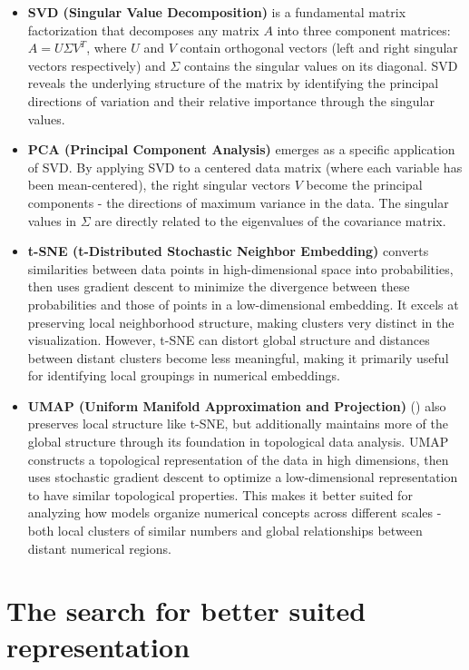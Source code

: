 \documentclass[
  a4paper, twoside, 10pt, titlepage]{book}
\begin{document}
\begin{itemize}
\item
  \textbf{SVD (Singular Value Decomposition)} is a fundamental matrix
  factorization that decomposes any matrix \(A\) into three component
  matrices: \(A = U\Sigma V^T\), where \(U\) and \(V\) contain
  orthogonal vectors (left and right singular vectors respectively) and
  \(\Sigma\) contains the singular values on its diagonal. SVD reveals
  the underlying structure of the matrix by identifying the principal
  directions of variation and their relative importance through the
  singular values.
\item
  \textbf{PCA (Principal Component Analysis)} emerges as a specific
  application of SVD. By applying SVD to a centered data matrix (where
  each variable has been mean-centered), the right singular vectors
  \(V\) become the principal components - the directions of maximum
  variance in the data. The singular values in \(\Sigma\) are directly
  related to the eigenvalues of the covariance matrix.
\item
  \textbf{t-SNE (t-Distributed Stochastic Neighbor Embedding)} converts
  similarities between data points in high-dimensional space into
  probabilities, then uses gradient descent to minimize the divergence
  between these probabilities and those of points in a low-dimensional
  embedding. It excels at preserving local neighborhood structure,
  making clusters very distinct in the visualization. However, t-SNE can
  distort global structure and distances between distant clusters become
  less meaningful, making it primarily useful for identifying local
  groupings in numerical embeddings.
\item
  \textbf{UMAP (Uniform Manifold Approximation and Projection)}
  () also preserves
  local structure like t-SNE, but additionally maintains more of the
  global structure through its foundation in topological data analysis.
  UMAP constructs a topological representation of the data in high
  dimensions, then uses stochastic gradient descent to optimize a
  low-dimensional representation to have similar topological properties.
  This makes it better suited for analyzing how models organize
  numerical concepts across different scales - both local clusters of
  similar numbers and global relationships between distant numerical
  regions.
\end{itemize}

\section{The search for better suited
representation}\label{the-search-for-better-suited-representation}
\end{document}
